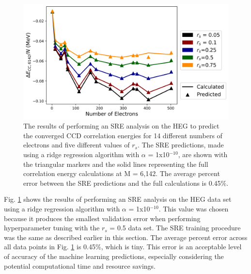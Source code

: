 \begin{figure}
    \centering
    \includegraphics[scale=0.75]{Images/Chapter7/ElectronGas/rs_0_5_EG_Ridge.png}
    \caption{The results of performing an SRE analysis on the HEG to predict the converged CCD correlation energies for 14 different numbers of electrons and five different values of $r_s$.  The SRE predictions, made using a ridge regression algorithm with $\alpha$ = 1x10$^{-10}$, are shown with the triangular markers and the solid lines representing the full correlation energy calculations at M = 6,142. The average percent error between the SRE predictions and the full calculations is 0.45$\%$.}
    \label{fig:rr_tune}
\end{figure}


Fig. \ref{fig:rr_tune} shows the results of performing an SRE analysis on the HEG data set using a ridge regression algorithm with $\alpha$ = 1x10$^{-10}$. This value was chosen because it produces the smallest validation error when performing hyperparameter tuning with the $r_s$ = 0.5 data set. The SRE training procedure was the same as described earlier in this section. The average percent error across all data points in Fig. \ref{fig:rr_tune} is 0.45$\%$, which is tiny. This error is an acceptable level of accuracy of the machine learning predictions, especially considering the potential computational time and resource savings. 

